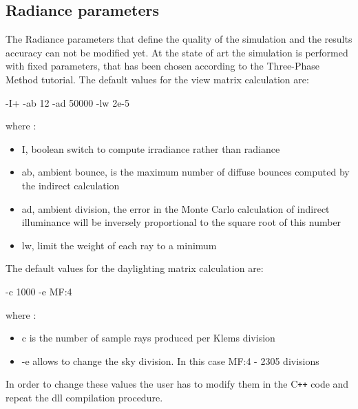 \subsection{Radiance parameters}
The Radiance parameters that define the quality of the simulation and the results accuracy can not be modified yet. At the state of art the simulation is performed with fixed parameters, that has been chosen according to the Three-Phase Method tutorial. The default values for the view matrix calculation are:

\begin{center}
-I+ -ab 12 -ad 50000 -lw 2e-5
\end{center}

where \cite{rad_tut}:
\begin{itemize}
\renewcommand{\labelitemi}{\tiny$\blacksquare$}
\item I, boolean switch to compute irradiance rather than radiance
\item ab, ambient bounce, is the maximum number of diffuse bounces computed by the indirect calculation
\item ad, ambient division, the error in the Monte Carlo calculation of indirect illuminance will be inversely proportional to the square root of this number
\item lw, limit the weight of each ray to a minimum
\end{itemize}

The default values for the daylighting matrix calculation are: 
\begin{center}
-c 1000 -e MF:4
\end{center}
where \cite{3ph_tut}: 
\begin{itemize}
\renewcommand{\labelitemi}{\tiny$\blacksquare$}
\item c is the number of sample rays produced per Klems division
\item -e allows to change the sky division. In this case MF:4 - 2305 divisions
\end{itemize}

In order to change these values the user has to modify them in the C\texttt{++} code and repeat the dll compilation procedure.